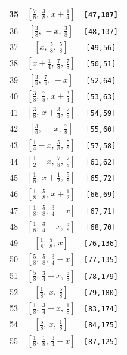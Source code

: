 \documentclass[fleqn,8pt]{jsarticle}
\begin{document}
\begin{longtable}{ccc}
35 & $\left[ \frac{7}{8},\, \frac{3}{8},\, x + \frac{1}{4} \right]$ & {\tt [47,187]} \\ \hline
36 & $\left[ \frac{3}{8},\, - x,\, \frac{3}{8} \right]$ & {\tt [48,137]} \\ \hline
37 & $\left[ x,\, \frac{5}{8},\, \frac{5}{8} \right]$ & {\tt [49,56]} \\ \hline
38 & $\left[ x + \frac{1}{4},\, \frac{7}{8},\, \frac{7}{8} \right]$ & {\tt [50,51]} \\ \hline
39 & $\left[ \frac{3}{8},\, \frac{7}{8},\, - x \right]$ & {\tt [52,64]} \\ \hline
40 & $\left[ \frac{3}{8},\, \frac{7}{8},\, x + \frac{3}{4} \right]$ & {\tt [53,63]} \\ \hline
41 & $\left[ \frac{3}{8},\, x + \frac{3}{4},\, \frac{7}{8} \right]$ & {\tt [54,59]} \\ \hline
42 & $\left[ \frac{3}{8},\, - x,\, \frac{7}{8} \right]$ & {\tt [55,60]} \\ \hline
43 & $\left[ \frac{1}{4} - x,\, \frac{5}{8},\, \frac{5}{8} \right]$ & {\tt [57,58]} \\ \hline
44 & $\left[ \frac{1}{2} - x,\, \frac{7}{8},\, \frac{7}{8} \right]$ & {\tt [61,62]} \\ \hline
45 & $\left[ \frac{1}{8},\, x + \frac{1}{2},\, \frac{5}{8} \right]$ & {\tt [65,72]} \\ \hline
46 & $\left[ \frac{1}{8},\, \frac{5}{8},\, x + \frac{1}{2} \right]$ & {\tt [66,69]} \\ \hline
47 & $\left[ \frac{1}{8},\, \frac{5}{8},\, \frac{3}{4} - x \right]$ & {\tt [67,71]} \\ \hline
48 & $\left[ \frac{1}{8},\, \frac{3}{4} - x,\, \frac{5}{8} \right]$ & {\tt [68,70]} \\ \hline
49 & $\left[ \frac{1}{8},\, \frac{5}{8},\, x \right]$ & {\tt [76,136]} \\ \hline
50 & $\left[ \frac{5}{8},\, \frac{5}{8},\, \frac{3}{4} - x \right]$ & {\tt [77,135]} \\ \hline
51 & $\left[ \frac{5}{8},\, \frac{3}{4} - x,\, \frac{5}{8} \right]$ & {\tt [78,179]} \\ \hline
52 & $\left[ \frac{1}{8},\, x,\, \frac{5}{8} \right]$ & {\tt [79,180]} \\ \hline
53 & $\left[ \frac{1}{8},\, \frac{3}{4} - x,\, \frac{1}{8} \right]$ & {\tt [83,174]} \\ \hline
54 & $\left[ \frac{5}{8},\, x,\, \frac{1}{8} \right]$ & {\tt [84,175]} \\ \hline
55 & $\left[ \frac{1}{8},\, \frac{1}{8},\, \frac{3}{4} - x \right]$ & {\tt [87,125]} \\ \hline

\end{longtable}
\end{document}
